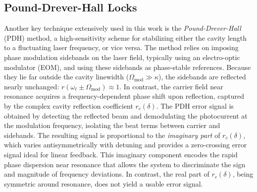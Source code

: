 \subsection{Pound-Drever-Hall Locks}
Another key technique extensively used in this work is the \textit{Pound-Drever-Hall} (PDH) method, a high-sensitivity scheme for stabilizing either the cavity length to a fluctuating laser frequency, or vice versa. The method relies on imposing phase modulation sidebands on the laser field, typically using an electro-optic modulator (EOM), and using these sidebands as phase-stable references. Because they lie far outside the cavity linewidth (\( \Omega_{\text{mod}} \gg \kappa \)), the sidebands are reflected nearly unchanged: \( r(\omega_\ell \pm \Omega_{\text{mod}}) \approx 1 \). In contrast, the carrier field near resonance acquires a frequency-dependent phase shift upon reflection, captured by the complex cavity reflection coefficient \( r_c(\delta) \). The PDH error signal is obtained by detecting the reflected beam and demodulating the photocurrent at the modulation frequency, isolating the beat terms between carrier and sidebands. The resulting signal is proportional to the \textit{imaginary part} of \( r_c(\delta) \), which varies antisymmetrically with detuning and provides a zero-crossing error signal ideal for linear feedback. This imaginary component encodes the rapid phase dispersion near resonance that allows the system to discriminate the sign and magnitude of frequency deviations. In contrast, the real part of \( r_c(\delta) \), being symmetric around resonance, does not yield a usable error signal. \newline

